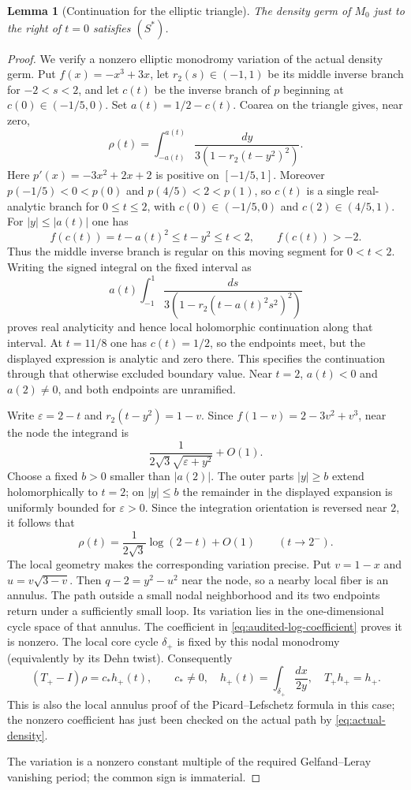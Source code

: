 \documentclass[11pt]{article}
\numberwithin{equation}{section}
\newtheorem{lemma}[lemma]{Lemma}
\theoremstyle{definition}
\theoremstyle{remark}
\begin{document}
\begin{lemma}[Continuation for the elliptic triangle]\label{lem:elliptic-continuation}
The density germ of $M_0$ just to the right of $t=0$ satisfies $(S^*)$.
\end{lemma}
\begin{proof}
We verify a nonzero elliptic monodromy variation of the actual density germ.
Put $f(x)=-x^3+3x$, let $r_2(s)\in(-1,1)$ be its middle inverse branch
for $-2<s<2$, and let $c(t)$ be the inverse branch of $p$ beginning at
$c(0)\in(-1/5,0)$. Set $a(t)=1/2-c(t)$. Coarea on the triangle gives,
near zero,
\begin{equation}\label{eq:actual-density}
 \rho(t)=\int_{-a(t)}^{a(t)}
 \frac{dy}{3(1-r_2(t-y^2)^2)}.
\end{equation}
Here $p'(x)=-3x^2+2x+2$ is positive on $[-1/5,1]$.
Moreover $p(-1/5)<0<p(0)$ and $p(4/5)<2<p(1)$, so $c(t)$ is a
single real-analytic branch for $0\le t\le2$, with
$c(0)\in(-1/5,0)$ and $c(2)\in(4/5,1)$. For
$|y|\le|a(t)|$ one has
\[
 f(c(t))=t-a(t)^2\le t-y^2\le t<2,
 \qquad f(c(t))>-2.
\]
Thus the middle inverse branch is regular on this moving segment for
$0<t<2$. Writing the signed integral on the fixed interval as
\[
 a(t)\int_{-1}^1
 \frac{ds}{3(1-r_2(t-a(t)^2s^2)^2)}
\]
proves real analyticity and hence local holomorphic continuation along
that interval. At $t=11/8$ one has $c(t)=1/2$, so the endpoints meet,
but the displayed expression is analytic and zero there. This specifies
the continuation through that otherwise excluded boundary value. Near
$t=2$, $a(t)<0$ and $a(2)\ne0$, and both endpoints are unramified.

Write $\varepsilon=2-t$ and $r_2(t-y^2)=1-v$. Since
$f(1-v)=2-3v^2+v^3$, near the node the integrand is
\[
 \frac1{2\sqrt3\sqrt{\varepsilon+y^2}}+O(1).
\]
Choose a fixed $b>0$ smaller than $|a(2)|$. The outer parts
$|y|\ge b$ extend holomorphically to $t=2$; on $|y|\le b$ the remainder
in the displayed expansion is uniformly bounded for $\varepsilon>0$.
Since the integration orientation is reversed near $2$, it follows that
\begin{equation}\label{eq:audited-log-coefficient}
 \rho(t)=\frac{1}{2\sqrt3}\log(2-t)+O(1)
 \qquad(t\to2^-).
\end{equation}
The local geometry makes the corresponding variation precise. Put
$v=1-x$ and $u=v\sqrt{3-v}$. Then $q-2=y^2-u^2$ near the node, so a
nearby local fiber is an annulus. The path outside a small nodal
neighborhood and its two endpoints return under a sufficiently small
loop. Its variation lies in the one-dimensional cycle space of that
annulus. The coefficient in \eqref{eq:audited-log-coefficient} proves it
is nonzero. The local core cycle $\delta_+$ is fixed by this nodal
monodromy (equivalently by its Dehn twist). Consequently
\[
 (T_+-I)\rho=c_*h_+(t),\qquad c_*\ne0,
 \quad h_+(t)=\int_{\delta_+}\frac{dx}{2y},
 \quad T_+h_+=h_+.
\]
This is also the local annulus proof of the Picard--Lefschetz formula in
this case; the nonzero coefficient has just been checked on the actual
path by \eqref{eq:actual-density}.

The variation is a nonzero constant multiple of the required
Gelfand--Leray vanishing period; the common sign is immaterial.
\end{proof}
\end{document}
